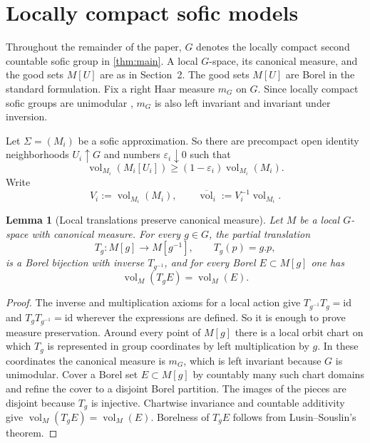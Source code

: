 \documentclass[12pt]{amsart}
\newtheorem{lemma}[lemma]{Lemma}
\theoremstyle{definition}
\newtheorem{remark}[remark]{Remark}
\newcommand{\Haar}{m_G}
\newcommand{\vol}{\operatorname{vol}}
\newcommand{\1}{\mathbf 1}
\newcommand{\eps}{\varepsilon}
\newcommand{\dbar}{\overline{\vol}}
\begin{document}

\section{Locally compact sofic models}

Throughout the remainder of the paper, $G$ denotes the locally compact second countable sofic group in \cref{thm:main}. A local $G$-space, its canonical measure, and the good sets $M[U]$ are as in Section~2. The good sets $M[U]$ are Borel in the standard formulation. Fix a right Haar measure $\Haar$ on $G$.
Since locally compact sofic groups are unimodular
\cite{BowenBurton}, $\Haar$ is also left invariant and invariant under
inversion.

Let $\Sigma=(M_i)$ be a sofic approximation. So there are precompact open identity neighborhoods $U_i\uparrow G$ and numbers $\eps_i\downarrow0$ such that
\[
 \vol_{M_i}(M_i[U_i])\geq (1-\eps_i)\vol_{M_i}(M_i).
\]
Write
\[
V_i:=\vol_{M_i}(M_i),\qquad \dbar_i:=V_i^{-1}\vol_{M_i}.
\]



\begin{lemma}[Local translations preserve canonical measure]\label{lem:local-measure-preserving}
Let $M$ be a local $G$-space with canonical measure.
For every $g\in G$, the partial translation
\[
T_g:M[g]\to M[g^{-1}],\qquad T_g(p)=g.p,
\]
is a Borel bijection with inverse $T_{g^{-1}}$, and for every Borel
$E\subset M[g]$ one has
\[
\operatorname{vol}_M(T_gE)=\operatorname{vol}_M(E).
\]
\end{lemma}


\begin{proof}
	The inverse and multiplication axioms for a local action give
	$T_{g^{-1}}T_g=\mathrm{id}$ and $T_gT_{g^{-1}}=\mathrm{id}$ wherever the
	expressions are defined. So it is enough to prove measure
	preservation. Around every point of $M[g]$ there is a local orbit chart on
	which $T_g$ is represented in group coordinates by left multiplication by
	$g$. In these coordinates the canonical measure is $\Haar$, which is left
	invariant because $G$ is unimodular. Cover a Borel set $E\subset M[g]$ by
	countably many such chart domains and refine the cover to a disjoint Borel
	partition. The images of the pieces are disjoint because $T_g$ is injective.
	Chartwise invariance and countable additivity give
	$\vol_M(T_gE)=\vol_M(E)$. Borelness of $T_gE$ follows from Lusin--Souslin's theorem.
\end{proof}
\end{document}
